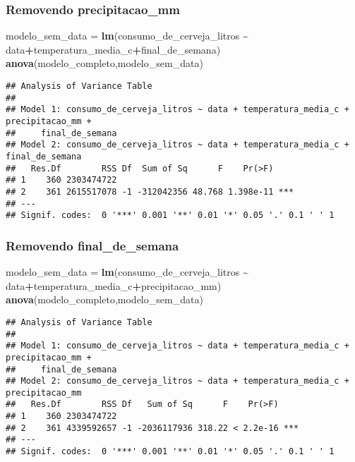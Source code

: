 \documentclass[
]{article}
\newenvironment{Shaded}{\begin{snugshade}}{\end{snugshade}}
\newcommand{\FunctionTok}[1]{\textcolor[rgb]{0.13,0.29,0.53}{\textbf{#1}}}
\newcommand{\NormalTok}[1]{#1}
\newcommand{\OtherTok}[1]{\textcolor[rgb]{0.56,0.35,0.01}{#1}}
\newcommand{\SpecialCharTok}[1]{\textcolor[rgb]{0.81,0.36,0.00}{\textbf{#1}}}
\begin{document}
\hypertarget{removendo-precipitacao_mm}{%
\subsubsection{Removendo
precipitacao\_mm}\label{removendo-precipitacao_mm}}

\begin{Shaded}
\begin{Highlighting}[]
\NormalTok{modelo\_sem\_data }\OtherTok{=} \FunctionTok{lm}\NormalTok{(consumo\_de\_cerveja\_litros }\SpecialCharTok{\textasciitilde{}} 
\NormalTok{                       data}\SpecialCharTok{+}\NormalTok{temperatura\_media\_c}\SpecialCharTok{+}\NormalTok{final\_de\_semana)}
\FunctionTok{anova}\NormalTok{(modelo\_completo,modelo\_sem\_data)}
\end{Highlighting}
\end{Shaded}

\begin{verbatim}
## Analysis of Variance Table
## 
## Model 1: consumo_de_cerveja_litros ~ data + temperatura_media_c + precipitacao_mm + 
##     final_de_semana
## Model 2: consumo_de_cerveja_litros ~ data + temperatura_media_c + final_de_semana
##   Res.Df        RSS Df  Sum of Sq      F    Pr(>F)    
## 1    360 2303474722                                   
## 2    361 2615517078 -1 -312042356 48.768 1.398e-11 ***
## ---
## Signif. codes:  0 '***' 0.001 '**' 0.01 '*' 0.05 '.' 0.1 ' ' 1
\end{verbatim}

\hypertarget{removendo-final_de_semana}{%
\subsubsection{Removendo
final\_de\_semana}\label{removendo-final_de_semana}}

\begin{Shaded}
\begin{Highlighting}[]
\NormalTok{modelo\_sem\_data }\OtherTok{=} \FunctionTok{lm}\NormalTok{(consumo\_de\_cerveja\_litros }\SpecialCharTok{\textasciitilde{}} 
\NormalTok{                       data}\SpecialCharTok{+}\NormalTok{temperatura\_media\_c}\SpecialCharTok{+}\NormalTok{precipitacao\_mm)}
\FunctionTok{anova}\NormalTok{(modelo\_completo,modelo\_sem\_data)}
\end{Highlighting}
\end{Shaded}

\begin{verbatim}
## Analysis of Variance Table
## 
## Model 1: consumo_de_cerveja_litros ~ data + temperatura_media_c + precipitacao_mm + 
##     final_de_semana
## Model 2: consumo_de_cerveja_litros ~ data + temperatura_media_c + precipitacao_mm
##   Res.Df        RSS Df   Sum of Sq      F    Pr(>F)    
## 1    360 2303474722                                    
## 2    361 4339592657 -1 -2036117936 318.22 < 2.2e-16 ***
## ---
## Signif. codes:  0 '***' 0.001 '**' 0.01 '*' 0.05 '.' 0.1 ' ' 1
\end{verbatim}
\end{document}
